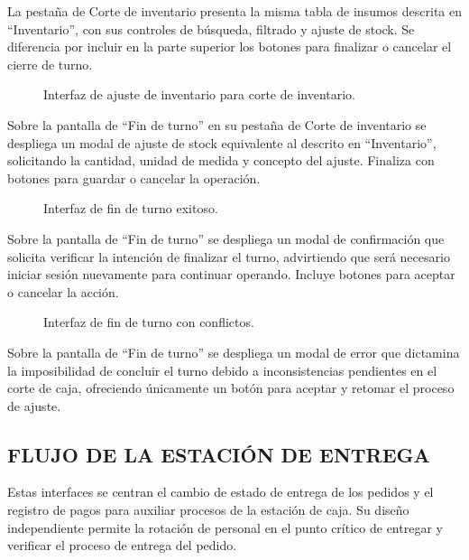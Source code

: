 La pestaña de Corte de inventario presenta la misma tabla de insumos descrita en ``Inventario'', con sus controles de búsqueda, filtrado y ajuste de stock. Se diferencia por incluir en la parte superior los botones para finalizar o cancelar el cierre de turno.

\begin{figure}[H]
    \centering
    
    \caption{Interfaz de ajuste de inventario para corte de inventario.}
    \label{fig:ui-caj-23-a}
\end{figure}

Sobre la pantalla de ``Fin de turno'' en su pestaña de Corte de inventario se despliega un modal de ajuste de stock equivalente al descrito en ``Inventario'', solicitando la cantidad, unidad de medida y concepto del ajuste. Finaliza con botones para guardar o cancelar la operación.

\begin{figure}[H]
    \centering
    
    \caption{Interfaz de fin de turno exitoso.}
    \label{fig:ui-caj-24-a}
\end{figure}

Sobre la pantalla de ``Fin de turno'' se despliega un modal de confirmación que solicita verificar la intención de finalizar el turno, advirtiendo que será necesario iniciar sesión nuevamente para continuar operando. Incluye botones para aceptar o cancelar la acción.

\begin{figure}[H]
    \centering
    
    \caption{Interfaz de fin de turno con conflictos.}
    \label{fig:ui-caj-24-b}
\end{figure}

Sobre la pantalla de ``Fin de turno'' se despliega un modal de error que dictamina la imposibilidad de concluir el turno debido a inconsistencias pendientes en el corte de caja, ofreciendo únicamente un botón para aceptar y retomar el proceso de ajuste.

\subsection{FLUJO DE LA ESTACIÓN DE ENTREGA}
Estas interfaces se centran el cambio de estado de entrega de los pedidos y el registro de pagos para auxiliar procesos de la estación de caja. Su diseño independiente permite la rotación de personal en el punto crítico de entregar y verificar el proceso de entrega del pedido. 

